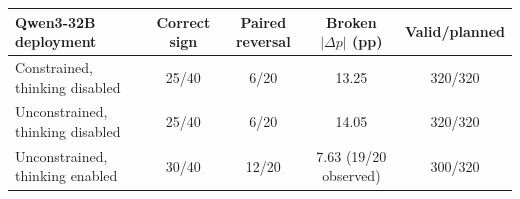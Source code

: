 \begin{tabular}{@{}lcccc@{}}
\toprule
Qwen3-32B deployment & Correct sign & Paired reversal & Broken $|\Delta p|$ (pp) & Valid/planned \\
\midrule
Constrained, thinking disabled & 25/40 & 6/20 & 13.25 & 320/320 \\
Unconstrained, thinking disabled & 25/40 & 6/20 & 14.05 & 320/320 \\
Unconstrained, thinking enabled & 30/40 & 12/20 & 7.63 (19/20 observed) & 300/320 \\
\bottomrule
\end{tabular}
